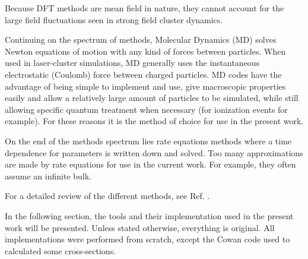 Because DFT methods are mean field in nature, they cannot account for the large
field fluctuations seen in strong field cluster dynamics.

Continuing on the spectrum of methods, Molecular Dynamics (MD) solves Newton
equations of motion with any kind of forces between particles. When used in
laser-cluster simulations, MD generally uses the instantaneous electrostatic
(Coulomb) force between charged particles. MD codes have the advantage of being
simple to implement and use, give macroscopic properties easily and allow a
relatively large amount of particles to be simulated, while still allowing
specific quantum treatment when necessary (for ionization events for example). For
these reasons it is the method of choice for use in the present work.

On the end of the methods spectrum lies rate equations methods where a time
dependence for parameters is written down and solved. Too many approximations
are made by rate equations for use in the current work. For example, they often
assume an infinite bulk.

For a detailed review of the different methods, see Ref. \cite{Fennel2010}.

In the following section, the tools and their implementation used in the present
work will be presented. Unless stated otherwise, everything is original.
All implementations were performed from scratch, except the Cowan
code\cite{CowanCode} used to calculated some cross-sections.








